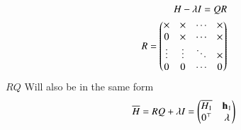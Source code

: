 \documentclass[journal]{IEEEtran}
\begin{document}
\begin{align}
H  - \lambda I = QR\\
R = \begin{pmatrix}\times & \times & \cdots & \times\\
	0 & \times & \cdots & \times\\
	\vdots & \vdots & \ddots & \times\\
	0 & 0 & \cdots & 0\end{pmatrix}
\end{align}
$RQ$ Will also be in the same form
\begin{align}
\overline{H} = RQ+\lambda I = \begin{pmatrix}\overline{H_1} & \mathbf{h}_1\\0^\top & \lambda\end{pmatrix}
\end{align}
\end{document}
